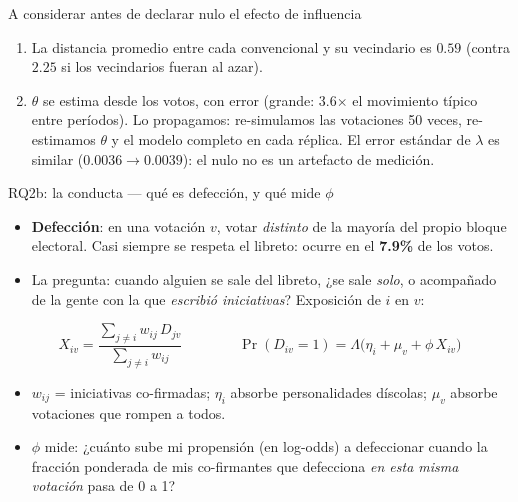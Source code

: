 \documentclass[aspectratio=169,11pt]{beamer}
\newcommand{\emphr}[1]{{\color{ndreddark}\textbf{#1}}}
\begin{document}
\begin{frame}{A considerar antes de declarar nulo el efecto de influencia}
\begin{enumerate}
  \item La distancia promedio entre cada convencional y su vecindario es $0.59$ (contra $2.25$ si los vecindarios fueran al azar).
  \vspace{0.25cm}
  \item $\theta$ se estima desde los votos, con error (grande: 3.6$\times$ el movimiento típico entre períodos). Lo propagamos: re-simulamos las votaciones 50 veces, re-estimamos $\theta$ y el modelo completo en cada réplica. El error estándar de $\lambda$ es similar ($0.0036 \to 0.0039$): el nulo no es un artefacto de medición.
\end{enumerate}
\end{frame}



\begin{frame}{RQ2b: la conducta — qué es defección, y qué mide $\phi$}
\begin{itemize}
  \item \emphr{Defección}: en una votación $v$, votar \emph{distinto} de la mayoría del propio bloque electoral. Casi siempre se respeta el libreto: ocurre en el \emphr{7.9\%} de los votos.
  \item La pregunta: cuando alguien se sale del libreto, ¿se sale \emph{solo}, o acompañado de la gente con la que \emph{escribió iniciativas}? Exposición de $i$ en $v$:
\end{itemize}
$$X_{iv} = \frac{\sum_{j \neq i} w_{ij}\, D_{jv}}{\sum_{j \neq i} w_{ij}}
\qquad\qquad
\Pr(D_{iv} = 1) = \Lambda\big(\eta_i + \mu_v + \phi\, X_{iv}\big)$$
\begin{itemize}
  \item $w_{ij}$ = iniciativas co-firmadas; $\eta_i$ absorbe personalidades díscolas; $\mu_v$ absorbe votaciones que rompen a todos.
  \item \emphr{$\phi$} mide: ¿cuánto sube mi propensión (en log-odds) a defeccionar cuando la fracción ponderada de mis co-firmantes que defecciona \emph{en esta misma votación} pasa de 0 a 1?
\end{itemize}
\end{frame}
\end{document}
